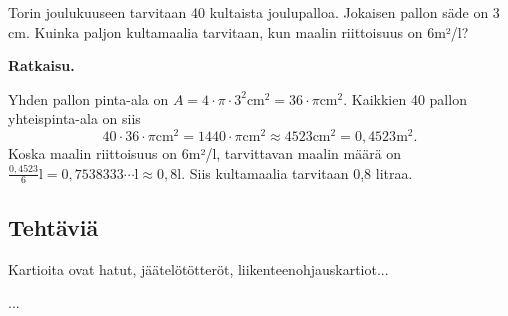 
\begin{esimerkki}
Torin joulukuuseen tarvitaan 40 kultaista joulupalloa. Jokaisen pallon säde on 3 cm. Kuinka paljon kultamaalia tarvitaan, kun maalin riittoisuus on 6m²/l?

\textbf{Ratkaisu.}

Yhden pallon pinta-ala on $A= 4 \cdot \pi \cdot 3^2 \text{cm}^2=36\cdot \pi \text{cm}^2$. Kaikkien 40 pallon yhteispinta-ala on siis
$$40 \cdot 36 \cdot \pi \text{cm}^2 = 1440 \cdot \pi \text{cm}^2 \approx 4523 \text{cm}^2 =0,4523 \text{m}^2.$$
Koska maalin riittoisuus on 6m²/l, tarvittavan maalin määrä on $\frac{0,4523}{6}\text{l}=0,7538333 \cdots \text{l} \approx 0,8\text{l}$.
Siis kultamaalia tarvitaan 0,8 litraa.
\end{esimerkki}

\subsection*{Tehtäviä}

\begin{tehtava}
Kartioita ovat hatut, jäätelötötteröt, liikenteenohjauskartiot...
\begin{vastaus}
...
\end{vastaus}
\end{tehtava}
